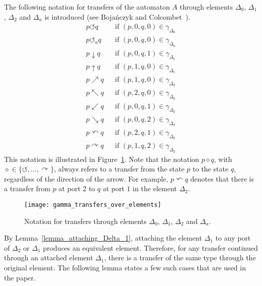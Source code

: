 \documentclass[12pt,a4paper]{article}
\theoremstyle{definition}
\begin{document}
The following notation for transfers
of the automaton $A$ through elements
$\Delta_0$, $\Delta_1$, $\Delta_2$ and $\Delta_a$
is introduced
(see Boja\'nczyk and Colcombet~\cite[Fig.~5.1]{BojanczykColcombet_reg}).
\begin{align*}
p \circlearrowleft q && \text{if } (p, 0, q, 0) \in \gamma_{\Delta_0}\\
p \circlearrowleft_a q && \text{if } (p, 0, q, 0) \in \gamma_{\Delta_a}\\
p \downarrow q && \text{if } (p, 0, q, 1) \in \gamma_{\Delta_1}\\
p \uparrow q && \text{if } (p, 1, q, 0) \in \gamma_{\Delta_1}\\
p \nearrow q && \text{if } (p, 1, q, 0) \in \gamma_{\Delta_2}\\
p \nwarrow q && \text{if } (p, 2, q, 0) \in \gamma_{\Delta_2}\\
p \swarrow q && \text{if } (p, 0, q, 1) \in \gamma_{\Delta_2}\\
p \searrow q && \text{if } (p, 0, q, 2) \in \gamma_{\Delta_2}\\
p \curvearrowleft q && \text{if } (p, 2, q, 1) \in \gamma_{\Delta_2}\\
p \curvearrowright q && \text{if } (p, 1, q, 2) \in \gamma_{\Delta_2}
\end{align*}
This notation is illustrated in Figure~\ref{f:gamma_transfers_over_elements}.
Note that the notation $p \diamond q$, with $\diamond \in \{\circlearrowleft, \ldots, \curvearrowright\}$,
always refers to a transfer from the state $p$ to the state $q$,
regardless of the direction of the arrow.
For example, $p \curvearrowleft q$ denotes that there is a transfer
from $p$ at port $2$ to $q$ at port $1$ in the element $\Delta_2$.

\begin{figure}[t]
	\centerline{\texttt{[image: gamma\_transfers\_over\_elements]}}
	\caption{Notation for transfers through elements $\Delta_0$, $\Delta_1$, $\Delta_2$ and $\Delta_a$.}
	\label{f:gamma_transfers_over_elements}
\end{figure}

By Lemma~\ref{lemma_attaching_Delta_1}, attaching the element $\Delta_1$
to any port of $\Delta_2$ or $\Delta_1$
produces an equivalent element.
Therefore, for any transfer continued through an attached element $\Delta_1$,
there is a transfer of the same type through the original element.
The following lemma states a few such cases that are used in the paper.
\end{document}
